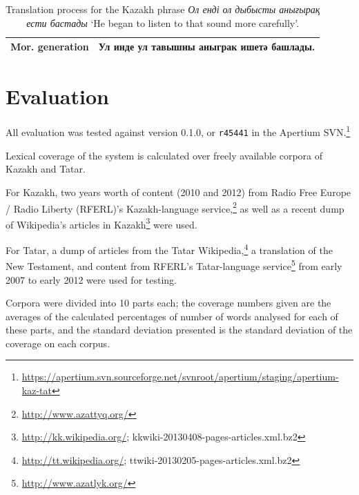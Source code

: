 \documentclass[a4paper,11pt]{article}
\newcommand{\tag}[1]{{\small{\texttt{#1}}}}
\newcommand{\eng}[1]{`#1'}
\begin{document}
\begin{table}[htbp]
\begin{tabular}{ll}
\midrule
{\bf Mor. generation} & Ул инде ул тавышны аныграк ишетә башлады. \\
\bottomrule
\end{tabular}
 \caption{Translation process for the Kazakh phrase \emph{Ол енді ол дыбысты анығырақ ести бастады} \eng{He began to listen to that sound more carefully}.}
 \label{tab:pipeline}
\end{table}

\section{Evaluation}
\label{sec:eval}

All evaluation was tested against version 0.1.0, or {\tt {\small r45441}} in the Apertium SVN.\footnote{\url{https://apertium.svn.sourceforge.net/svnroot/apertium/staging/apertium-kaz-tat}}

Lexical coverage of the system is calculated over freely available corpora of Kazakh and Tatar.

For Kazakh, two years worth of content (2010 and 2012) from Radio Free Europe / Radio Liberty (RFERL)'s Kazakh-language service,\footnote{\url{http://www.azattyq.org/}} as well as a recent dump of Wikipedia's articles in Kazakh\footnote{\url{http://kk.wikipedia.org/}; {\smallertt kkwiki-20130408-pages-articles.xml.bz2}} were used.

For Tatar, a dump of articles from the Tatar Wikipedia,\footnote{\url{http://tt.wikipedia.org/}; {\smallertt ttwiki-20130205-pages-articles.xml.bz2}} a translation of the New Testament, and content from RFERL's Tatar-language service\footnote{\url{http://www.azatlyk.org/}} from early 2007 to early 2012 were used for testing.

Corpora were divided into 10 parts each; the coverage numbers given are the averages of the calculated percentages of number of words analysed for each of these parts, and the standard deviation presented is the standard deviation of the coverage on each corpus.
\end{document}
